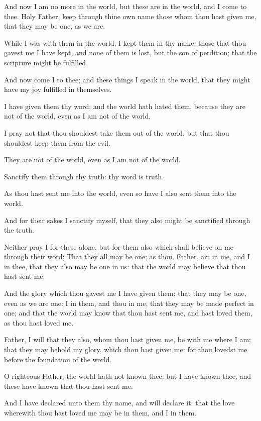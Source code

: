 \Verse And now I am no more in the world, but these are in the world, and I come to thee. Holy Father, keep through thine own name those whom thou hast given me, that they may be one, as we are.

\Verse While I was with them in the world, I kept them in thy name: those that thou gavest me I have kept, and none of them is lost, but the son of perdition; that the scripture might be fulfilled.

\Verse And now come I to thee; and these things I speak in the world, that they might have my joy fulfilled in themselves.

\Verse I have given them thy word; and the world hath hated them, because they are not of the world, even as I am not of the world.

\Verse I pray not that thou shouldest take them out of the world, but that thou shouldest keep them from the evil.

\Verse They are not of the world, even as I am not of the world.

\Verse Sanctify them through thy truth: thy word is truth.

\Verse As thou hast sent me into the world, even so have I also sent them into the world.

\Verse And for their sakes I sanctify myself, that they also might be sanctified through the truth.

\Verse Neither pray I for these alone, but for them also which shall believe on me through their word; \Verse That they all may be one; as thou, Father, art in me, and I in thee, that they also may be one in us: that the world may believe that thou hast sent me.

\Verse And the glory which thou gavest me I have given them; that they may be one, even as we are one: \Verse I in them, and thou in me, that they may be made perfect in one; and that the world may know that thou hast sent me, and hast loved them, as thou hast loved me.

\Verse Father, I will that they also, whom thou hast given me, be with me where I am; that they may behold my glory, which thou hast given me: for thou lovedst me before the foundation of the world.

\Verse O righteous Father, the world hath not known thee: but I have known thee, and these have known that thou hast sent me.

\Verse And I have declared unto them thy name, and will declare it: that the love wherewith thou hast loved me may be in them, and I in them.


